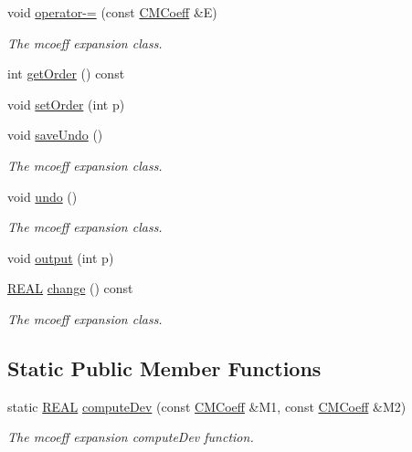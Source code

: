 \begin{DoxyCompactItemize}
void \hyperlink{classCMCoeff_a28161819e17994b61395e9ddc8532040}{operator-\/=} (const \hyperlink{classCMCoeff}{C\-M\-Coeff} \&E)
\begin{DoxyCompactList}\small\item\em The mcoeff expansion class. \end{DoxyCompactList}\item 
int \hyperlink{classCMCoeff_a4ca84260f5a63a33547ebce310b21c32}{get\-Order} () const 
\item 
void \hyperlink{classCMCoeff_a815a4d1f74b217ea54d9f05f6734004f}{set\-Order} (int p)
\item 
void \hyperlink{classCMCoeff_a99771333750460a0ba9c97f03bdaa6b9}{save\-Undo} ()
\begin{DoxyCompactList}\small\item\em The mcoeff expansion class. \end{DoxyCompactList}\item 
void \hyperlink{classCMCoeff_ae75856578c3de42f457cc6e2af17d1d4}{undo} ()
\begin{DoxyCompactList}\small\item\em The mcoeff expansion class. \end{DoxyCompactList}\item 
void \hyperlink{classCMCoeff_afe4e3e3719dc0808108353ab20b05c23}{output} (int p)
\item 
\hyperlink{util_8h_a5821460e95a0800cf9f24c38915cbbde}{R\-E\-A\-L} \hyperlink{classCMCoeff_a1bf2b3f4bba7f938a9d9d32855737699}{change} () const 
\begin{DoxyCompactList}\small\item\em The mcoeff expansion class. \end{DoxyCompactList}\end{DoxyCompactItemize}
\subsection*{Static Public Member Functions}
\begin{DoxyCompactItemize}
\item 
static \hyperlink{util_8h_a5821460e95a0800cf9f24c38915cbbde}{R\-E\-A\-L} \hyperlink{classCMCoeff_af24efe3725c507a1919b043a5335d9ff}{compute\-Dev} (const \hyperlink{classCMCoeff}{C\-M\-Coeff} \&M1, const \hyperlink{classCMCoeff}{C\-M\-Coeff} \&M2)
\begin{DoxyCompactList}\small\item\em The mcoeff expansion compute\-Dev function. \end{DoxyCompactList}\end{DoxyCompactItemize}
